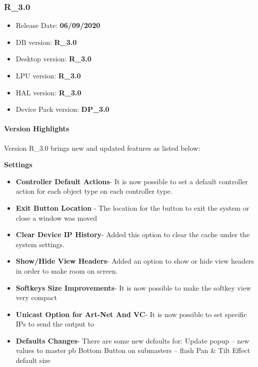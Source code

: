 \documentclass[
]{article}
\providecommand{\tightlist}{%
  \setlength{\itemsep}{0pt}\setlength{\parskip}{0pt}}
\begin{document}
\hypertarget{r_3.0}{%
\subsubsection{R\_3.0}\label{r_3.0}}

\begin{itemize}
\tightlist
\item
  Release Date: \textbf{06/09/2020}
\item
  DB version: \textbf{R\_3.0}
\item
  Desktop version: \textbf{R\_3.0}
\item
  LPU version: \textbf{R\_3.0}
\item
  HAL version: \textbf{R\_3.0}
\item
  Device Pack version: \textbf{DP\_3.0}
\end{itemize}

\hypertarget{version-highlights-4}{%
\paragraph{Version Highlights}\label{version-highlights-4}}

Version R\_3.0 brings new and updated features as listed below:

\textbf{Settings}

\begin{itemize}
\item
  \textbf{Controller Default Actions}- It is now possible to set a default controller action for each object type on each controller type.
\item
  \textbf{Exit Button Location} - The location for the button to exit the system or close a window was moved
\item
  \textbf{Clear Device IP History}- Added this option to clear the cache under the system settings.
\item
  \textbf{Show/Hide View Headers}- Added an option to show or hide view headers in order to make room on screen.
\item
  \textbf{Softkeys Size Improvements}- It is now possible to make the softkey view very compact
\item
  \textbf{Unicast Option for Art-Net And VC}- It is now possible to set specific IPs to send the output to
\item
  \textbf{Defaults Changes}- There are some new defaults for: Update popup -- new values to master pb Bottom Button on submasters -- flash Pan \& Tilt Effect default size
\end{itemize}
\end{document}
